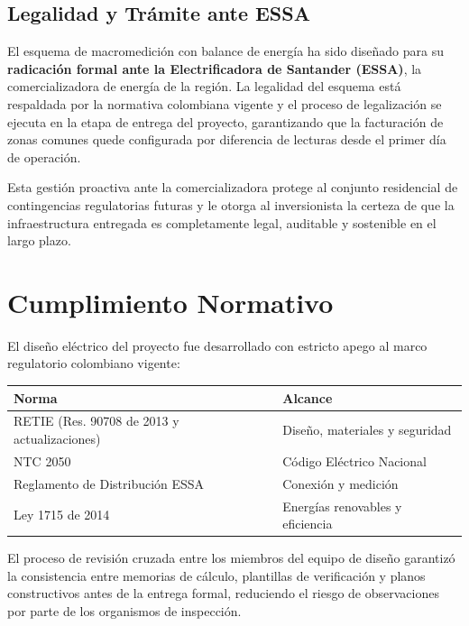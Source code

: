 \subsection{Legalidad y Tr\'amite ante ESSA}

El esquema de macromedici\'on con balance de energ\'ia ha sido
dise\~nado para su \textbf{radicaci\'on formal ante la
Electrificadora de Santander (ESSA)}, la comercializadora
de energ\'ia de la regi\'on. La legalidad del esquema est\'a
respaldada por la normativa colombiana vigente y el proceso
de legalizaci\'on se ejecuta en la etapa de entrega del
proyecto, garantizando que la facturaci\'on de zonas comunes
quede configurada por diferencia de lecturas desde el primer
d\'ia de operaci\'on.

Esta gesti\'on proactiva ante la comercializadora protege
al conjunto residencial de contingencias regulatorias futuras
y le otorga al inversionista la certeza de que la
infraestructura entregada es completamente legal, auditable
y sostenible en el largo plazo.

\section{Cumplimiento Normativo}

El dise\~no el\'ectrico del proyecto fue desarrollado con
estricto apego al marco regulatorio colombiano vigente:

\begin{tabular}{ll}
  \toprule
  \bfseries Norma & \bfseries Alcance \\
  \midrule
  RETIE (Res. 90708 de 2013 y actualizaciones) &
    Dise\~no, materiales y seguridad \\
  NTC 2050 &
    C\'odigo El\'ectrico Nacional \\
  Reglamento de Distribuci\'on ESSA &
    Conexi\'on y medici\'on \\
  Ley 1715 de 2014 &
    Energ\'ias renovables y eficiencia \\
  \bottomrule
\end{tabular}

\vspace{8pt}

El proceso de revisi\'on cruzada entre los miembros del equipo
de dise\~no garantiz\'o la consistencia entre memorias de
c\'alculo, plantillas de verificaci\'on y planos constructivos
antes de la entrega formal, reduciendo el riesgo de
observaciones por parte de los organismos de inspecci\'on.

